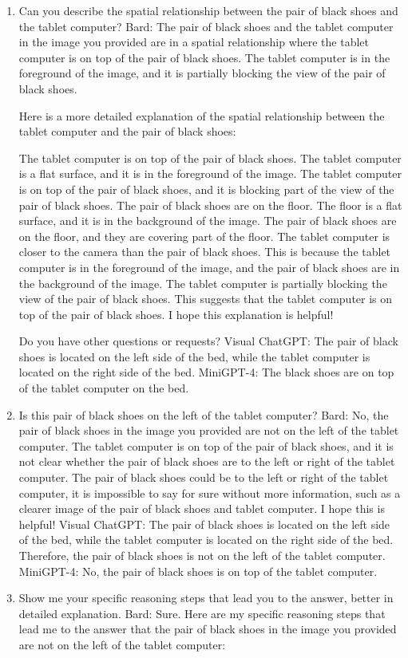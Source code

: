 \begin{enumerate}
    \item Can you describe the spatial relationship between the pair of black shoes and the tablet computer?
    \subitem Bard: The pair of black shoes and the tablet computer in the image you provided are in a spatial relationship where the tablet computer is on top of the pair of black shoes. The tablet computer is in the foreground of the image, and it is partially blocking the view of the pair of black shoes.

    Here is a more detailed explanation of the spatial relationship between the tablet computer and the pair of black shoes:
    
    The tablet computer is on top of the pair of black shoes. The tablet computer is a flat surface, and it is in the foreground of the image. The tablet computer is on top of the pair of black shoes, and it is blocking part of the view of the pair of black shoes.
    The pair of black shoes are on the floor. The floor is a flat surface, and it is in the background of the image. The pair of black shoes are on the floor, and they are covering part of the floor.
    The tablet computer is closer to the camera than the pair of black shoes. This is because the tablet computer is in the foreground of the image, and the pair of black shoes are in the background of the image.
    The tablet computer is partially blocking the view of the pair of black shoes. This suggests that the tablet computer is on top of the pair of black shoes.
    I hope this explanation is helpful!
    
    Do you have other questions or requests?
    \subitem Visual ChatGPT: The pair of black shoes is located on the left side of the bed, while the tablet computer is located on the right side of the bed.
    \subitem MiniGPT-4: The black shoes are on top of the tablet computer on the bed.
    \item Is this pair of black shoes on the left of the tablet computer?
    \subitem Bard: 
    No, the pair of black shoes in the image you provided are not on the left of the tablet computer. The tablet computer is on top of the pair of black shoes, and it is not clear whether the pair of black shoes are to the left or right of the tablet computer.
    The pair of black shoes could be to the left or right of the tablet computer, it is impossible to say for sure without more information, such as a clearer image of the pair of black shoes and tablet computer.
    I hope this is helpful! 
    \subitem Visual ChatGPT: The pair of black shoes is located on the left side of the bed, while the tablet computer is located on the right side of the bed. Therefore, the pair of black shoes is not on the left of the tablet computer.
    \subitem MiniGPT-4: No, the pair of black shoes is on top of the tablet computer.
    \item Show me your specific reasoning steps that lead you to the answer, better in detailed explanation.
    \subitem Bard: Sure. Here are my specific reasoning steps that lead me to the answer that the pair of black shoes in the image you provided are not on the left of the tablet computer:


\end{enumerate}
